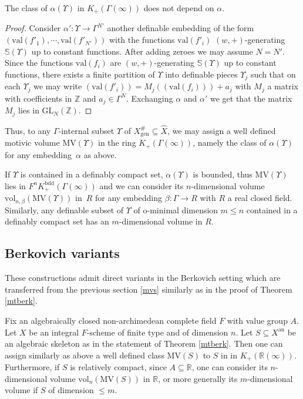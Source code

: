 \documentclass[JEP,XML,SOM,Unicode,ThmDefs,NoEqCountersInSection,published]{cedram}
\newcommand{\an}{^{\mathrm{an}}}
\newcommand{\val}{\mathrm{val}}
\newcommand{\R}{\mathbb R}
\newcommand{\Z}{\mathbb Z}
\renewcommand{\SS}{\mathbb S}
\theoremstyle{plain}
\theoremstyle{definition}
\begin{document}
\begin{prop}The class of $\alpha (\Upsilon)$ in
$K_+ (\Gamma (\infty))$ does not depend on $\alpha$.
\end{prop}

\begin{proof}Consider $\alpha':
\Upsilon \to \Gamma^{N'}$
another definable embedding of the form
$(\val (f'_1), \cdots, \val(f'_{N'}))$ with the functions
$\val (f'_i)$
$(w,+)$-generating $\SS(\Upsilon)$ up to constant functions.
After adding zeroes we may assume $N = N'$.
Since the functions
$\val (f_i)$ are
$(w,+)$-generating $\SS(\Upsilon)$ up to constant functions,
there exists a finite partition of $\Upsilon$ into
definable pieces $\Upsilon_j$ such that on each $\Upsilon_j$
we may write
$(\val (f'_i)) = M_j ((\val (f_i))) + a_j$ with $M_j$ a matrix with coefficients in
$\Z$ and $a_j \in \Gamma^N$.
Exchanging $\alpha$ and $\alpha'$ we get that the matrix $M_j$ lies in $\mathrm{GL}_N(\Z)$.
\end{proof}

Thus, to any $\Gamma$-internal subset $\Upsilon$
of $X^{\#}_{\mathrm{gen}}\subseteq \widehat X$,
we may assign a well defined motivic volume
$\mathrm{MV} (\Upsilon)$ in the ring
$K_+ (\Gamma (\infty))$, namely
the class of
$\alpha (\Upsilon)$ for any embedding~$\alpha$ as above.

If $\Upsilon$ is contained in a definably compact set, $\alpha (\Upsilon)$ is bounded, thus
$\mathrm{MV} (\Upsilon)$ lies in
$F^n K^{\mathrm{bdd}} _+ (\Gamma (\infty))$ and we can consider
its $n$\nobreakdash-dimen\-sional volume
$\mathrm{vol}_{n, \beta} (\mathrm{MV} (\Upsilon))$ in~$R$
for any embedding $\beta: \Gamma \to R$ with $R$ a real closed field.
Similarly, any definable subset of $\Upsilon$ of o-minimal dimension $m \leq n$ contained in
a definably compact set has an $m$-dimensional volume in $R$.

\subsection{Berkovich variants}
These constructions admit direct variants in the Berkovich setting which are transferred
from the previous section \ref{mvs} similarly as in the proof of
Theorem \ref{mtberk}.

Fix an algebraically closed non-archimedean complete field $F$ with value group $A$.
Let $X$ be an integral $F$-scheme of finite type and of dimension $n$.
Let $S\subseteq X\an$ be an algebraic skeleton as in the statement of Theorem \ref{mtberk}.
Then one can assign similarly as above a well defined class
$\mathrm{MV} (S)$ to $S$ in
in
$K_{+} (\R(\infty))$. Furthermore,
if $S$ is relatively compact, since $A \subseteq \R$, one can consider its
$n$\nobreakdash-dimen\-sional volume
$\mathrm{vol}_n (\mathrm{MV} (S))$ in $\R$, or more generally its $m$-dimensional volume if
$S$ of dimension $\leq m$.
\end{document}
